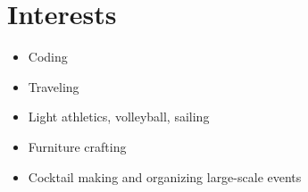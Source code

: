 \section{Interests}

\begin{paracol}{2}
\begin{itemize}
    \item Coding
    \item Traveling
    \item Light athletics, volleyball, sailing
\end{itemize}
\switchcolumn
\begin{itemize}
    \item Furniture crafting
    \item Cocktail making and organizing large-scale events
\end{itemize}
\end{paracol}
